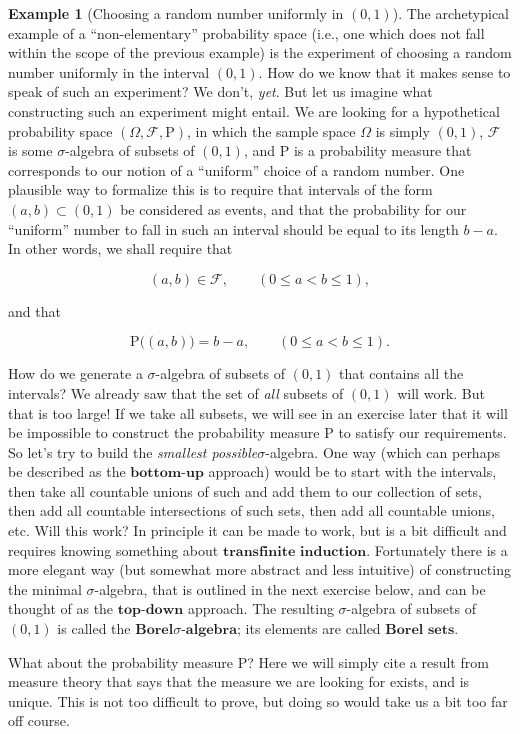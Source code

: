 \documentclass[11pt]{report}
\providecommand{\cal}{\mathcal}
\theoremstyle{plain}
\theoremstyle{definition}
\newtheorem{example}[thm]{Example}
\begin{document}
\begin{example}[Choosing a random number uniformly in $(0,1)$]
The archetypical example of a ``non-elementary''
probability space (i.e., one which does not fall
within the scope of the previous example) is the
experiment of choosing a random number uniformly in
the interval $(0,1)$. How do we know that it makes
sense to speak of such an experiment? We don't, \emph{yet}.
But let us imagine what constructing such an
experiment might entail. We are looking for a
hypothetical probability space
$(\Omega, {\cal F}, \mathrm{P})$, in which the sample
space $\Omega$ is simply $(0,1)$, ${\cal F}$ is some
$\sigma$-algebra of subsets of $(0,1)$, and
$\mathrm{P}$ is a probability measure that
corresponds to our notion of a ``uniform'' choice of a
random number. One plausible way to formalize this is
to require that intervals of the form
$(a,b) \subset (0,1)$ be considered as events, and
that the probability for our ``uniform'' number to
fall in such an interval should be equal to its length
$b-a$. In other words, we shall require that

\[
(a,b) \in {\cal F}, \qquad (0\le a<b\le 1),
\]

\noindent and that

\begin{equation*} \tag{1}\label{eq:lebesgue}
\mathrm{P}\big((a,b)\big) = b-a, \qquad (0\le a<b\le 1).
\end{equation*}

\noindent How do we generate a $\sigma$-algebra of subsets of
$(0,1)$ that contains all the intervals? We already
saw that the set of \emph{all} subsets of $(0,1)$ will
work. But that is too large! If we take all subsets,
we will see in an exercise later that it will be
impossible to construct the probability measure
$\mathrm{P}$ to satisfy our requirements. So let's
try to build the \emph{smallest possible}$\sigma$-algebra.
One way (which can perhaps be described as the
$\textbf{bottom-up}$ approach) would be to start with
the intervals, then take all countable unions of such
and add them to our collection of sets, then add all
countable intersections of such sets, then add all
countable unions, etc. Will this work? In principle it
can be made to work, but is a bit difficult and
requires knowing something about
$\textbf{transfinite induction}$. Fortunately there
is a more elegant way (but somewhat more abstract and
less intuitive) of constructing the minimal
$\sigma$-algebra, that is outlined in the next
exercise below, and can be thought of as the
$\textbf{top-down}$ approach. The resulting
$\sigma$-algebra of subsets of $(0,1)$ is called the
$\textbf{Borel$\sigma$-algebra}$; its elements are
called $\textbf{Borel sets}$.

What about the probability measure $\mathrm{P}$? Here
we will simply cite a result from measure theory that
says that the measure we are looking for exists, and
is unique. This is not too difficult to prove, but
doing so would take us a bit too far off course.
\end{example}
\end{document}
